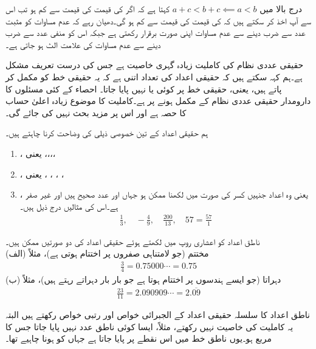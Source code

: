 درج بالا میں $a+c<b+c\impliedby a<b$ کہتا ہے کہ اگر  کی قیمت  کی قیمت سے کم ہو تب اس سے آپ اخذ کر سکتے ہیں کہ  کی قیمت  کی قیمت سے کم ہو گی۔دھیان رہے کہ عدم مساوات کو مثبت عدد سے ضرب دینے سے عدم مساوات اپنی صورت برقرار رکھتی ہے جبکہ اس کو منفی عدد سے ضرب دینے سے عدم مساوات کی علامت الٹ ہو جاتی ہے۔ 

حقیقی عددی نظام کی کاملیت زیادہ گہری خاصیت ہے جس کی درست تعریف مشکل ہے۔ہم کہہ سکتے ہیں کہ حقیقی اعداد کی تعداد اتنی ہے کہ یہ حقیقی خط کو مکمل کر پاتے ہیں، یعنی، حقیقی خط پر کوئی  یا  نہیں پایا جاتا۔ احصاء کے کئی مسئلوں کا دارومدار حقیقی عددی نظام کے مکمل ہونے پر ہے۔کاملیت کا موضوع زیادہ اعلیٰ  حساب کا حصہ ہے اور اس پر مزید بحث نہیں کی جائے گی۔  

ہم حقیقی اعداد کے تین خصوصی ذیلی  کی وضاحت کرنا چاہتے ہیں۔
\begin{enumerate}[1.]
\item
{}، یعنی ،،،،
\item
{}، یعنی ، ، ، ،
\item
{}، یعنی وہ اعداد جنہیں کسر  کی صورت میں لکھنا ممکن ہو جہاں  اور  عدد صحیح ہیں اور  غیر صفر  ہے۔اس کی مثالیں درج ذیل ہیں۔
\begin{align*}
\frac{1}{3},\quad -\frac{4}{9},\quad \frac{200}{13}, \quad 57=\frac{57}{1}
\end{align*} 
\end{enumerate}
ناطق اعداد کو اعشاری روپ میں لکھتے ہوئے حقیقی اعداد کی دو صورتیں ممکن ہیں۔\\
(الف) \quad
مختتم (جو لامتناہی صفروں پر اختتام ہوتی ہے)، مثلاً
\begin{align*}
\frac{3}{4}=0.75000\cdots=0.75
\end{align*}
(ب)\quad
دہراتا (جو ایسے ہندسوں پر اختتام ہوتا ہے جو بار بار دہراتے رہتے ہیں)، مثلاً
\begin{align*}
\frac{23}{11}=2.090909\cdots=2.\overline{09}
\end{align*}

ناطق اعداد  کا سلسلہ حقیقی اعداد کے الجبرائی خواص اور رتبی خواص  رکھتے ہیں البتہ یہ کاملیت کی خاصیت نہیں رکھتے، مثلاً، ایسا کوئی ناطق عدد نہیں پایا جاتا  جس کا مربع  ہو۔یوں ناطق خط میں اس نقطے پر  پایا جاتا ہے جہاں  کو ہونا چاہیے تھا۔

